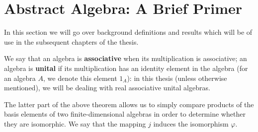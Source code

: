 \section{Abstract Algebra: A Brief Primer}\label{s:algebra}
In this section we will go over background definitions and results which will be of use in the subsequent chapters of the thesis.

%
%
%
%
%
%
%
%
%
%



We say that an algebra is \textbf{associative} when its multiplication is associative; an algebra is \textbf{unital} if its multiplication has an identity element in the algebra (for an algebra $A$, we denote this element $1_A$): in this thesis (unless otherwise mentioned), we will be dealing with real associative unital algebras.








	
\begin{remark}
	The latter part of the above theorem allows us to simply compare products of the basis elements of two finite-dimensional algebras in order to determine whether they are isomorphic. We say that the mapping $j$ induces the isomorphism $\varphi$.
\end{remark}
%






